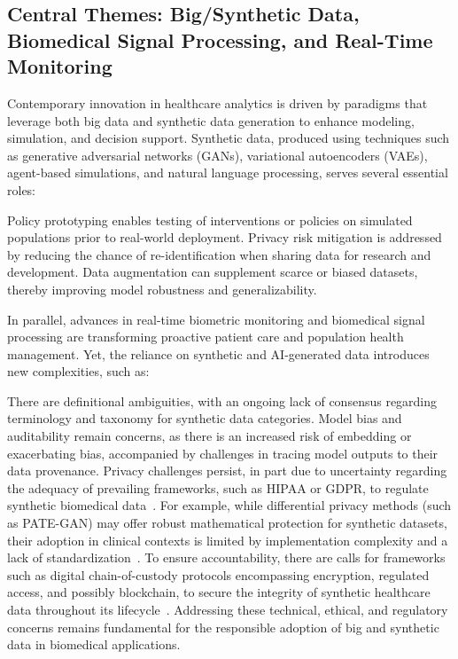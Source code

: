\documentclass[sigconf]{acmart}
\begin{document}
\subsection{Central Themes: Big/Synthetic Data, Biomedical Signal Processing, and Real-Time Monitoring}

Contemporary innovation in healthcare analytics is driven by paradigms that leverage both big data and synthetic data generation to enhance modeling, simulation, and decision support. Synthetic data, produced using techniques such as generative adversarial networks (GANs), variational autoencoders (VAEs), agent-based simulations, and natural language processing, serves several essential roles:

Policy prototyping enables testing of interventions or policies on simulated populations prior to real-world deployment. Privacy risk mitigation is addressed by reducing the chance of re-identification when sharing data for research and development. Data augmentation can supplement scarce or biased datasets, thereby improving model robustness and generalizability.

In parallel, advances in real-time biometric monitoring and biomedical signal processing are transforming proactive patient care and population health management. Yet, the reliance on synthetic and AI-generated data introduces new complexities, such as:

There are definitional ambiguities, with an ongoing lack of consensus regarding terminology and taxonomy for synthetic data categories. Model bias and auditability remain concerns, as there is an increased risk of embedding or exacerbating bias, accompanied by challenges in tracing model outputs to their data provenance. Privacy challenges persist, in part due to uncertainty regarding the adequacy of prevailing frameworks, such as HIPAA or GDPR, to regulate synthetic biomedical data~\cite{ref91}. For example, while differential privacy methods (such as PATE-GAN) may offer robust mathematical protection for synthetic datasets, their adoption in clinical contexts is limited by implementation complexity and a lack of standardization~\cite{ref91}. To ensure accountability, there are calls for frameworks such as digital chain-of-custody protocols encompassing encryption, regulated access, and possibly blockchain, to secure the integrity of synthetic healthcare data throughout its lifecycle~\cite{ref91}. Addressing these technical, ethical, and regulatory concerns remains fundamental for the responsible adoption of big and synthetic data in biomedical applications.
\end{document}
